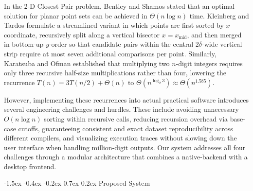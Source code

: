 \documentclass[10pt,twocolumn]{article}
\makeatletter
\renewcommand\section{\@startsection{section}{1}{\z@}%
  {-1.5ex \@plus -0.4ex \@minus -0.2ex}%
  {0.7ex \@plus 0.2ex}%
  {\normalfont\normalsize\bfseries}}
\makeatother
\begin{document}
In the 2-D Closest Pair problem, Bentley and Shamos \cite{bentley1976divide} stated that an optimal solution for planar point sets can be achieved in $\Theta(n \log n)$ time. Kleinberg and Tardos \cite{kleinberg2006algorithm} formulate a streamlined variant in which points are first sorted by $x$-coordinate, recursively split along a vertical bisector $x = x_{\text{mid}}$, and then merged in bottom-up $y$-order so that candidate pairs within the central $2\delta$-wide vertical strip require at most seven additional comparisons per point. Similarly, Karatsuba and Ofman \cite{karatsuba1962multiplication} established that multiplying two $n$-digit integers requires only three recursive half-size multiplications rather than four, lowering the recurrence $T(n) = 3T(n/2) + \Theta(n)$ to $\Theta(n^{\log_2 3}) \approx \Theta(n^{1.585})$.

However, implementing these recurrences into actual practical software introduces several engineering challenges and hurdles. These include avoiding unnecessary $O(n \log n)$ sorting within recursive calls, reducing recursion overhead via base-case cutoffs, guaranteeing consistent and exact dataset reproducibility across different compilers, and visualizing execution traces without slowing down the user interface when handling million-digit outputs. Our system addresses all four challenges through a modular architecture that combines a native-backend with a desktop frontend.\newline

\section{Proposed System}
\end{document}
